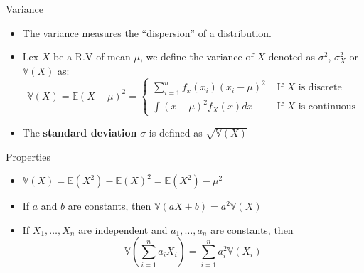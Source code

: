 \documentclass[handout]{beamer}
\begin{document}
\begin{frame}{Variance}
\scriptsize{
\begin{itemize}
 \item The variance measures the ``dispersion'' of a distribution.
 \item Lex $X$ be a R.V of mean $\mu$, we define the variance of $X$ denoted as $\sigma^2$, $\sigma^{2}_{X}$ or $\mathbb{V}(X)$ as:
  \begin{displaymath}
  \mathbb{V}(X) = \mathbb{E}(X - \mu)^2 =  \left\{ \begin{array}{rl}
  \sum_{i=1}^{n} f_{x}(x_{i})(x_{i} - \mu)^2 &\mbox{  If $X$ is discrete} \\
   \int (x- \mu)^{2}f_X(x)dx &\mbox{ If $X$ is continuous}
       \end{array} \right.
  \end{displaymath}
\item The \textbf{standard deviation} $\sigma$ is defined as $\sqrt{\mathbb{V}(X)}$ 
\end{itemize}

\begin{block}{Properties}
\begin{itemize}
\item $\mathbb{V}(X)=  \mathbb{E}(X^2)- \mathbb{E}(X)^2 =  \mathbb{E}(X^2)-\mu^2 $ 
\item If $a$ and $b$ are constants, then  $\mathbb{V}(aX+b)=a^2\mathbb{V}(X)$
\item If $X_1,\dots,X_n$ are independent and $a_1,\dots,a_n$ are constants, then
\begin{displaymath}
 \mathbb{V}\left(\sum_{i=1}^{n}a_i X_i \right) = \sum_{i=1}^{n} a_{i}^{2} \mathbb{V}(X_{i})
\end{displaymath}


\end{itemize}

 
\end{block}


}
\end{frame}
\end{document}
